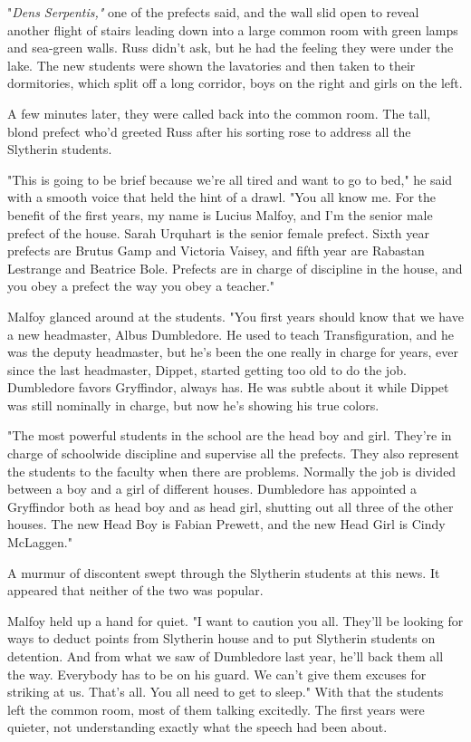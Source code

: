 \documentclass[a4paper,11pt]{article}
\begin{document}
"\emph{Dens Serpentis,"} one of the prefects said, and the wall slid open to reveal another flight of stairs leading down into a large common room with green lamps and sea-green walls. Russ didn't ask, but he had the feeling they were under the lake. The new students were shown the lavatories and then taken to their dormitories, which split off a long corridor, boys on the right and girls on the left.

A few minutes later, they were called back into the common room. The tall, blond prefect who'd greeted Russ after his sorting rose to address all the Slytherin students.

"This is going to be brief because we're all tired and want to go to bed," he said with a smooth voice that held the hint of a drawl. "You all know me. For the benefit of the first years, my name is Lucius Malfoy, and I'm the senior male prefect of the house. Sarah Urquhart is the senior female prefect. Sixth year prefects are Brutus Gamp and Victoria Vaisey, and fifth year are Rabastan Lestrange and Beatrice Bole. Prefects are in charge of discipline in the house, and you obey a prefect the way you obey a teacher."

Malfoy glanced around at the students. "You first years should know that we have a new headmaster, Albus Dumbledore. He used to teach Transfiguration, and he was the deputy headmaster, but he's been the one really in charge for years, ever since the last headmaster, Dippet, started getting too old to do the job. Dumbledore favors Gryffindor, always has. He was subtle about it while Dippet was still nominally in charge, but now he's showing his true colors.

"The most powerful students in the school are the head boy and girl. They're in charge of schoolwide discipline and supervise all the prefects. They also represent the students to the faculty when there are problems. Normally the job is divided between a boy and a girl of different houses. Dumbledore has appointed a Gryffindor both as head boy and as head girl, shutting out all three of the other houses. The new Head Boy is Fabian Prewett, and the new Head Girl is Cindy McLaggen."

A murmur of discontent swept through the Slytherin students at this news. It appeared that neither of the two was popular.

Malfoy held up a hand for quiet. "I want to caution you all. They'll be looking for ways to deduct points from Slytherin house and to put Slytherin students on detention. And from what we saw of Dumbledore last year, he'll back them all the way. Everybody has to be on his guard. We can't give them excuses for striking at us. That's all. You all need to get to sleep." With that the students left the common room, most of them talking excitedly. The first years were quieter, not understanding exactly what the speech had been about.
\end{document}
